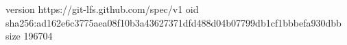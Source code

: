 version https://git-lfs.github.com/spec/v1
oid sha256:ad162e6c3775aea08f10b3a43627371dfd488d04b07799db1cf1bbbefa930dbb
size 196704
